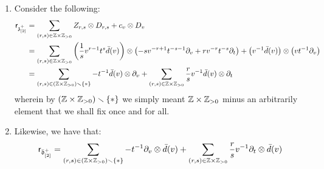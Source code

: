 \begin{remark}
\begin{enumerate}
                    \item Consider the following:
                        $$
                            \begin{aligned}
                                \sfr_{\z_{[2]}^+} & = \sum_{(r, s) \in \Z \x \Z_{> 0}} Z_{r, s} \tensor D_{r, s} + c_v \tensor D_v
                                \\
                                & = \sum_{(r, s) \in \Z \x \Z_{> 0}} \left(\frac1s v^{r - 1} t^s \bar{d}(v)\right) \tensor \left(-s v^{-r + 1} t^{-s - 1} \del_v + r v^{-r} t^{-s} \del_t\right) + \left(v^{-1} \bar{d}(v)\right) \tensor \left(v t^{-1} \del_v\right)
                                \\
                                & = \sum_{(r, s) \in (\Z \x \Z_{> 0}) \setminus \{*\}} -t^{-1} \bar{d}(v) \tensor \del_v + \sum_{(r, s) \in \Z \x \Z_{> 0}} \frac{r}{s} v^{-1} \bar{d}(v) \tensor \del_t
                            \end{aligned}
                        $$
                    wherein by $(\Z \x \Z_{> 0}) \setminus \{*\}$ we simply meant $\Z \x \Z_{> 0}$ minus an arbitrarily element that we shall fix once and for all. 
                    \item Likewise, we have that:
                        $$\sfr_{\bar{\d}_{[2]}^+} = \sum_{(r, s) \in (\Z \x \Z_{> 0}) \setminus \{*\}} -t^{-1} \del_v \tensor \bar{d}(v) + \sum_{(r, s) \in \Z \x \Z_{> 0}} \frac{r}{s} v^{-1} \del_t \tensor \bar{d}(v)$$
                \end{enumerate}


\end{remark}

